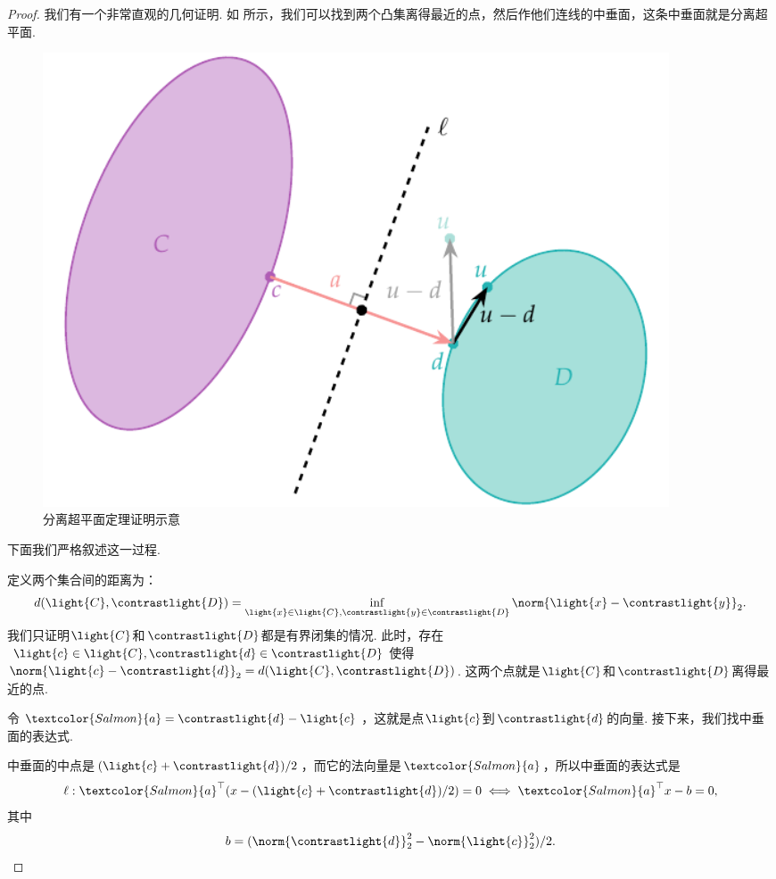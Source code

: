 \begin{proof}

    我们有一个非常直观的几何证明. 如 所示，我们可以找到两个凸集离得最近的点，然后作他们连线的中垂面，这条中垂面就是分离超平面. 
    
    \begin{figure}[H]
        \centering
        \includegraphics[width=0.9\textwidth]{Figures/convex-anlaysis/separation-proof.pdf}
        \caption{分离超平面定理证明示意}
        \label{fig:separation-proof}
    \end{figure}
    
    下面我们严格叙述这一过程. 

    定义两个集合间的距离为：
    \[
    d(\light{C}, \contrastlight{D}) = \inf_{\light{x} \in \light{C}, \contrastlight{y} \in \contrastlight{D}} \norm{\light{x} - \contrastlight{y}}_2.
    \]
    我们只证明$\light{C}$和$\contrastlight{D}$都是有界闭集的情况. 此时，存在$\light{c} \in \light{C}, \contrastlight{d} \in \contrastlight{D}$使得$\norm{\light{c} - \contrastlight{d}}_2 = d(\light{C}, \contrastlight{D})$. 这两个点就是$\light{C}$和$\contrastlight{D}$离得最近的点.
    
    令$\textcolor{Salmon}{a} = \contrastlight{d} - \light{c}$，这就是点$\light{c}$到$\contrastlight{d}$的向量. 接下来，我们找中垂面的表达式. 
    
    中垂面的中点是$(\light{c} + \contrastlight{d})/2$，而它的法向量是$\textcolor{Salmon}{a}$，所以中垂面的表达式是
    \[
    \ell : \textcolor{Salmon}{a}^\top (x - (\light{c} + \contrastlight{d})/2) = 0 \iff \textcolor{Salmon}{a}^\top x - b = 0,
    \]
    其中
    \[
    b = (\norm{\contrastlight{d}}_2^2 - \norm{\light{c}}_2^2)/2.
    \]
    

\end{proof}
